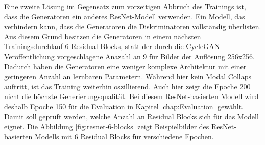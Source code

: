 Eine zweite Lösung im Gegensatz zum vorzeitigen Abbruch des Trainings ist, dass die Generatoren ein anderes ResNet-Modell verwenden. Ein Modell, das verhindern kann, dass die Generatoren die Diskriminatoren vollständig überlisten. Aus diesem Grund besitzen die Generatoren in einem nächsten Trainingsdurchlauf 6 Residual Blocks, statt der durch die \ac{CycleGAN} Veröffentlichung vorgeschlagene Anazahl an 9 für Bilder der Auflösung 256x256. Dadurch haben die Generatoren eine weniger komplexe Architektur mit einer geringeren Anzahl an lernbaren Parametern. Während hier kein Modal Collaps auftritt, ist das Training weiterhin oszillierend. Auch hier zeigt die Epoche 200 nicht die höchste Generierungsqualität. Bei diesem ResNet-basierten Modell wird deshalb Epoche 150 für die Evaluation in Kapitel \ref{chap:Evaluation} gewählt. Damit soll geprüft werden, welche Anzahl an Residual Blocks sich für das Modell eignet. Die Abbildung \ref{fig:resnet-6-blocks} zeigt Beispielbilder des ResNet-basierten Modells mit 6 Residual Blocks für verschiedene Epochen.

